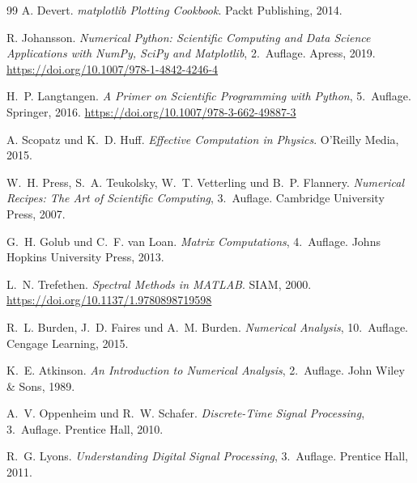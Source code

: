 \documentclass[12pt, a4paper]{article}
\begin{document}
\begin{thebibliography}{99}
A. Devert.
\textit{matplotlib Plotting Cookbook}.
Packt Publishing, 2014.


R. Johansson.
\textit{Numerical Python: Scientific Computing and Data Science
Applications with NumPy, SciPy and Matplotlib}, 2.~Auflage.
Apress, 2019.
\url{https://doi.org/10.1007/978-1-4842-4246-4}

H.~P. Langtangen.
\textit{A Primer on Scientific Programming with Python}, 5.~Auflage.
Springer, 2016.
\url{https://doi.org/10.1007/978-3-662-49887-3}

A. Scopatz und K.~D. Huff.
\textit{Effective Computation in Physics}.
O'Reilly Media, 2015.


W.~H. Press, S.~A. Teukolsky, W.~T. Vetterling und B.~P. Flannery.
\textit{Numerical Recipes: The Art of Scientific Computing}, 3.~Auflage.
Cambridge University Press, 2007.

G.~H. Golub und C.~F. van Loan.
\textit{Matrix Computations}, 4.~Auflage.
Johns Hopkins University Press, 2013.

L.~N. Trefethen.
\textit{Spectral Methods in MATLAB}.
SIAM, 2000.
\url{https://doi.org/10.1137/1.9780898719598}

R.~L. Burden, J.~D. Faires und A.~M. Burden.
\textit{Numerical Analysis}, 10.~Auflage.
Cengage Learning, 2015.

K.~E. Atkinson.
\textit{An Introduction to Numerical Analysis}, 2.~Auflage.
John Wiley \& Sons, 1989.


A.~V. Oppenheim und R.~W. Schafer.
\textit{Discrete-Time Signal Processing}, 3.~Auflage.
Prentice Hall, 2010.

R.~G. Lyons.
\textit{Understanding Digital Signal Processing}, 3.~Auflage.
Prentice Hall, 2011.


\end{thebibliography}
\end{document}
